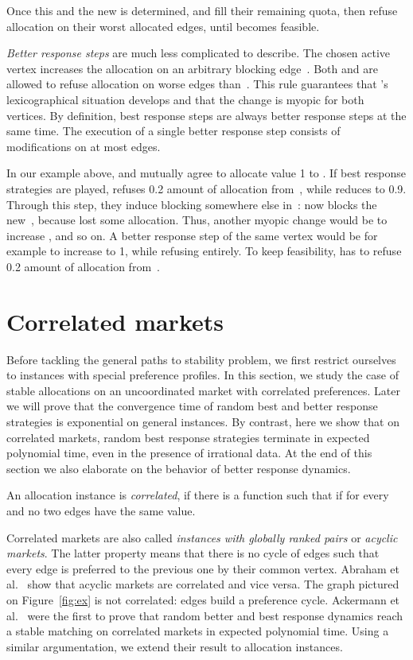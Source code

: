 \documentclass{llncs}
\begin{document}
Once this  and the new  is determined,  and  fill their remaining quota, then refuse allocation on their worst allocated edges, until  becomes feasible.

\emph{Better response steps} are much less complicated to describe. The chosen active vertex  increases the allocation on an arbitrary blocking edge~. Both  and  are allowed to refuse allocation on worse edges than~. This rule guarantees that 's lexicographical situation develops and that the change is myopic for both vertices. By definition, best response steps are always better response steps at the same time. The execution of a single better response step consists of modifications on at most  edges.

In our example above,  and  mutually agree to allocate value 1 to . If best response strategies are played,  refuses 0.2 amount of allocation from~, while  reduces  to 0.9. Through this step, they induce blocking somewhere else in~: now  blocks the new~, because  lost some allocation. Thus, another myopic change would be to increase , and so on. A better response step of the same vertex  would be for example to increase  to 1, while refusing  entirely. To keep feasibility,  has to refuse 0.2 amount of allocation from~.

\section{Correlated markets}
\label{sec:corr}

Before tackling the general paths to stability problem, we first restrict ourselves to instances with special preference profiles. In this section, we study the case of stable allocations on an uncoordinated market with correlated preferences. Later we will prove that the convergence time of random best and better response strategies is exponential on general instances. By contrast, here we show that on correlated markets, random best response strategies terminate in expected polynomial time, even in the presence of irrational data. At the end of this section we also elaborate on the behavior of better response dynamics.

\begin{definition}
An allocation instance is \emph{correlated}, if there is a function   such that  if  for every  and no two edges have the same  value.
\end{definition}

Correlated markets are also called \emph{instances with globally ranked pairs} or \emph{acyclic markets}. The latter property means that there is no cycle of edges such that every edge is preferred to the previous one by their common vertex. Abraham et al.~\cite{enlighten4494} show that acyclic markets are correlated and vice versa. The graph pictured on Figure~\ref{fig:ex} is not correlated: edges  build a preference cycle.
Ackermann et al.~\cite{ackermann2011uncoordinated} were the first to prove that random better and best response dynamics reach a stable matching on correlated markets in expected polynomial time. Using a similar argumentation, we extend their result to allocation instances.
\end{document}
